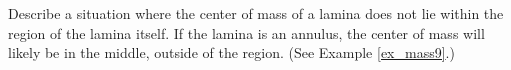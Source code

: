 {Describe a situation where the center of mass of a lamina does not lie within the region of the lamina itself.
}
{If the lamina is an annulus, the center of mass will likely be in the middle, outside of the region. (See Example \ref{ex_mass9}.)
}